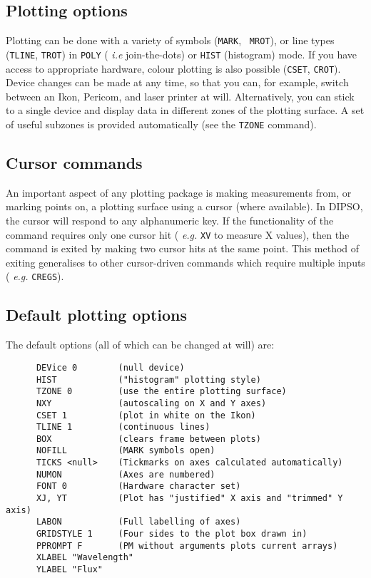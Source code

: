 \subsection {Plotting options}

Plotting can be done with a variety of symbols ({\tt MARK}, {\tt
MROT}), or line types ({\tt TLINE}, {\tt TROT}) in {\tt POLY} ({\em
i.e} join-the-dots) or {\tt HIST} (histogram) mode. If you have access
to appropriate hardware, colour plotting is also possible ({\tt CSET},
{\tt CROT}). Device changes can be made at any time, so that you can,
for example, switch between an Ikon, Pericom, and laser printer at
will. Alternatively, you can stick to a single device and display data
in different zones of the plotting surface. A set of useful subzones
is provided automatically (see the {\tt TZONE} command).

\subsection {Cursor commands}

An important aspect of any plotting package is making measurements
from, or marking points on, a plotting surface using a cursor (where
available). In DIPSO, the cursor will respond to any alphanumeric key.
If the functionality of the command requires only one cursor hit ({\em
e.g.} {\tt XV} to measure X values), then the command is exited by making
two cursor hits at the same point. This method of exiting generalises
to other cursor-driven commands which require multiple inputs ({\em
e.g.} {\tt CREGS}).

\subsection {Default plotting options}

The default options (all of which can be changed at will) are:

\begin{verbatim}
      DEVice 0        (null device)
      HIST            ("histogram" plotting style)
      TZONE 0         (use the entire plotting surface)
      NXY             (autoscaling on X and Y axes)
      CSET 1          (plot in white on the Ikon)
      TLINE 1         (continuous lines)
      BOX             (clears frame between plots)
      NOFILL          (MARK symbols open)
      TICKS <null>    (Tickmarks on axes calculated automatically)
      NUMON           (Axes are numbered)  
      FONT 0          (Hardware character set)
      XJ, YT          (Plot has "justified" X axis and "trimmed" Y axis)
      LABON           (Full labelling of axes)
      GRIDSTYLE 1     (Four sides to the plot box drawn in)
      PPROMPT F       (PM without arguments plots current arrays)
      XLABEL "Wavelength"
      YLABEL "Flux"
\end{verbatim}

